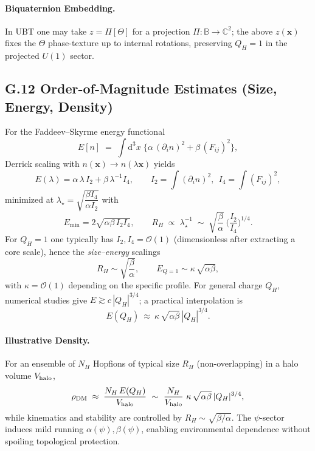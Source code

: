 \documentclass[12pt,a4paper]{article}
\begin{document}
\paragraph{Biquaternion Embedding.} In UBT one may take $z=\Pi[\Theta]$ for a projection $\Pi:\mathbb{B}\!\to\!\mathbb{C}^2$; the above $z(\mathbf{x})$ fixes the $\Theta$ phase-texture up to internal rotations, preserving $Q_H=1$ in the projected $U(1)$ sector.

\subsection*{G.12 Order-of-Magnitude Estimates (Size, Energy, Density)}
For the Faddeev--Skyrme energy functional
\begin{equation}
E[n] \;=\; \int\!\mathrm{d}^3x\;\Big\{\alpha\, (\partial_i n)^2 + \beta\, (F_{ij})^2\Big\},
\end{equation}
Derrick scaling with $n(\mathbf{x})\to n(\lambda \mathbf{x})$ yields
\begin{equation}
E(\lambda)= \alpha\, \lambda\, I_2 + \beta\, \lambda^{-1} I_4,\qquad
I_2=\!\int\! (\partial_i n)^2,\ \ I_4=\!\int\! (F_{ij})^2,
\end{equation}
minimized at $\lambda_\star=\sqrt{\dfrac{\beta I_4}{\alpha I_2}}$ with
\begin{equation}
E_{\min}=2\sqrt{\alpha\beta\, I_2 I_4},\qquad
R_H \;\propto\; \lambda_\star^{-1} \;\sim\; \sqrt{\frac{\beta}{\alpha}}\, \Big(\frac{I_2}{I_4}\Big)^{1/4}.
\end{equation}
For $Q_H=1$ one typically has $I_2,I_4=\mathcal{O}(1)$ (dimensionless after extracting a core scale), hence the \emph{size--energy} scalings
\begin{equation}
R_H \sim \sqrt{\frac{\beta}{\alpha}},\qquad E_{Q=1} \sim \kappa\, \sqrt{\alpha\beta},
\end{equation}
with $\kappa=\mathcal{O}(1)$ depending on the specific profile. For general charge $Q_H$, numerical studies give $E \gtrsim c\,|Q_H|^{3/4}$; a practical interpolation is
\begin{equation}
E(Q_H)\ \approx\ \kappa\, \sqrt{\alpha\beta}\, |Q_H|^{3/4}.
\end{equation}
\paragraph{Illustrative Density.} For an ensemble of $N_H$ Hopfions of typical size $R_H$ (non-overlapping) in a halo volume $V_{\rm halo}$,
\begin{equation}
\rho_{\rm DM} \;\approx\; \frac{N_H\, E(Q_H)}{V_{\rm halo}} \ \sim\  \frac{N_H}{V_{\rm halo}}\ \kappa\, \sqrt{\alpha\beta}\, |Q_H|^{3/4},
\end{equation}
while kinematics and stability are controlled by $R_H\!\sim\!\sqrt{\beta/\alpha}$. The $\psi$-sector induces mild running $\alpha(\psi),\beta(\psi)$, enabling environmental dependence without spoiling topological protection.
\end{document}
